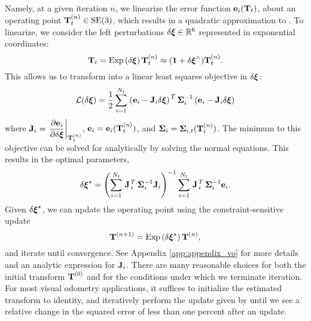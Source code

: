 Namely, at a given iteration $n$, we linearize the error function $\boldsymbol{\mathbf{e}}_{i}(\boldsymbol{\mathbf{T}}_t)$, about an operating point $\boldsymbol{\mathbf{T}}_t^{(n)} \in \mathrm{SE}(3)$, which results in a quadratic approximation to . To linearize, we consider the left perturbations $\delta\Vector{\xi}\in\RealNumbers[6]$ represented in exponential
coordinates:
\begin{equation}
  \boldsymbol{\mathbf{T}}_t = \mathrm{Exp}\left({\delta\boldsymbol{\mathbf{\xi}}}\right) \boldsymbol{\mathbf{T}}_t^{(n)} \approx (\boldsymbol{\mathbf{1}} + \delta\boldsymbol{\mathbf{\xi}}^{\wedge}) \boldsymbol{\mathbf{T}}_t^{(n)}.
\end{equation}
This allows us to transform  into a linear least squares objective in $\delta\boldsymbol{\mathbf{\xi}}$:
\begin{equation}
\label{eq:vo_linleastsquares}
  \mathcal{L}(\delta \boldsymbol{\mathbf{\xi}}) = \frac{1}{2}\sum_{i=1}^{N_t} 
  \left.{\left(\boldsymbol{\mathbf{e}}_{i}
  - \boldsymbol{\mathbf{J}}_{i} \delta\boldsymbol{\mathbf{\xi}}\right)}\right.^T
\boldsymbol{\mathbf{\Sigma}}_{i}^{-1}
 \left(\boldsymbol{\mathbf{e}}_{i}
 - \boldsymbol{\mathbf{J}}_{i} \delta\boldsymbol{\mathbf{\xi}}\right)
  \end{equation}
where $\boldsymbol{\mathbf{J}}_{i} = \left.\dfrac{\partial \boldsymbol{\mathbf{e}}_i}{\partial \delta \boldsymbol{\mathbf{\xi}}}\right|_{\boldsymbol{\mathbf{T}}_t^{(n)}}$, $\boldsymbol{\mathbf{e}}_{i} = \boldsymbol{\mathbf{e}}_{i}(\boldsymbol{\mathbf{T}}_t^{(n)})$, and $\boldsymbol{\mathbf{\Sigma}}_{i} =  \boldsymbol{\mathbf{\Sigma}}_{i,t}(\boldsymbol{\mathbf{T}}_t^{(n)})$. 
The minimum to this objective can be solved for analytically by solving the normal equations. This results in the optimal parameters,  
\begin{equation}
  \delta\boldsymbol{\mathbf{\xi}}^{\star} = 
  \left( \sum_{i=1}^{N_t} \left.{\boldsymbol{\mathbf{J}}}\right.^T_{i}
  \boldsymbol{\mathbf{\Sigma}}_{i}^{-1} \boldsymbol{\mathbf{J}}_{i} \right)^{-1}
  \sum_{i=1}^{N_t} \left.{\boldsymbol{\mathbf{J}}}\right.^T_{i}
  \boldsymbol{\mathbf{\Sigma}}_{i}^{-1} \boldsymbol{\mathbf{e}}_{i}. 
\label{eq:least-squares-iteration}
\end{equation}
Given $\delta\boldsymbol{\mathbf{\xi}}^{\star}$, we can update the operating point using the constraint-sensitive update
\begin{equation}
  \boldsymbol{\mathbf{T}}^{(n+1)} = \mathrm{Exp}\left({\delta\boldsymbol{\mathbf{\xi}}^{\star}}\right) \boldsymbol{\mathbf{T}}^{(n)}, \label{eq:vo_se3_update}
\end{equation}
and iterate until convergence. See Appendix \ref{app:appendix_vo}
for more details and an analytic expression for $\boldsymbol{\mathbf{J}}_{i}$. 
There are many reasonable choices for both the initial transform
$\boldsymbol{\mathbf{T}}^{(0)}$ and for the conditions under which we terminate
iteration. For most visual odometry applications, it suffices to initialize the estimated transform to identity, and iteratively
perform the update given by  until we see a relative change in
the squared error of less than one percent after an update. 

